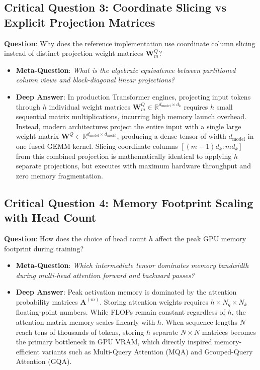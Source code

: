 \documentclass[11pt,a4paper]{article}
\theoremstyle{definition}
\begin{document}
\subsection{\textbf{Critical Question 3: Coordinate Slicing vs Explicit Projection Matrices}}
\textbf{Question}: Why does the reference implementation use coordinate column slicing instead of distinct projection weight matrices $\mathbf{W}_m^Q$?
\begin{itemize}
    \item \textbf{Meta-Question}: \emph{What is the algebraic equivalence between partitioned column views and block-diagonal linear projections?}
    \item \textbf{Deep Answer}: In production Transformer engines, projecting input tokens through $h$ individual weight matrices $\mathbf{W}_m^Q \in \mathbb{R}^{d_{\text{model}} \times d_k}$ requires $h$ small sequential matrix multiplications, incurring high memory launch overhead. Instead, modern architectures project the entire input with a single large weight matrix $\mathbf{W}^Q \in \mathbb{R}^{d_{\text{model}} \times d_{\text{model}}}$, producing a dense tensor of width $d_{\text{model}}$ in one fused GEMM kernel. Slicing coordinate columns $[(m-1)d_k : m d_k]$ from this combined projection is mathematically identical to applying $h$ separate projections, but executes with maximum hardware throughput and zero memory fragmentation.
\end{itemize}

\subsection{\textbf{Critical Question 4: Memory Footprint Scaling with Head Count}}
\textbf{Question}: How does the choice of head count $h$ affect the peak GPU memory footprint during training?
\begin{itemize}
    \item \textbf{Meta-Question}: \emph{Which intermediate tensor dominates memory bandwidth during multi-head attention forward and backward passes?}
    \item \textbf{Deep Answer}: Peak activation memory is dominated by the attention probability matrices $\mathbf{A}^{(m)}$. Storing attention weights requires $h \times N_q \times N_k$ floating-point numbers. While FLOPs remain constant regardless of $h$, the attention matrix memory scales linearly with $h$. When sequence lengths $N$ reach tens of thousands of tokens, storing $h$ separate $N \times N$ matrices becomes the primary bottleneck in GPU VRAM, which directly inspired memory-efficient variants such as Multi-Query Attention (MQA) and Grouped-Query Attention (GQA).
\end{itemize}
\end{document}
